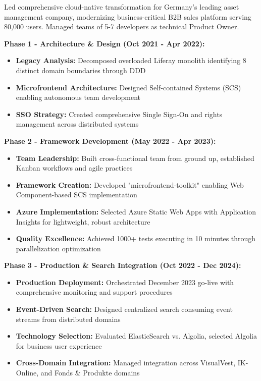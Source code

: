 \documentclass[10pt,a4paper]{article}
\begin{document}
Led comprehensive cloud-native transformation for Germany's leading asset management company, modernizing business-critical B2B sales platform serving 80,000 users. Managed teams of 5-7 developers as technical Product Owner.

\textbf{Phase 1 - Architecture \& Design (Oct 2021 - Apr 2022):}
\begin{itemize}
    \item \textbf{Legacy Analysis:} Decomposed overloaded Liferay monolith identifying 8 distinct domain boundaries through DDD
    \item \textbf{Microfrontend Architecture:} Designed Self-contained Systems (SCS) enabling autonomous team development
    \item \textbf{SSO Strategy:} Created comprehensive Single Sign-On and rights management across distributed systems
\end{itemize}

\textbf{Phase 2 - Framework Development (May 2022 - Apr 2023):}
\begin{itemize}
    \item \textbf{Team Leadership:} Built cross-functional team from ground up, established Kanban workflows and agile practices
    \item \textbf{Framework Creation:} Developed "microfrontend-toolkit" enabling Web Component-based SCS implementation
    \item \textbf{Azure Implementation:} Selected Azure Static Web Apps with Application Insights for lightweight, robust architecture
    \item \textbf{Quality Excellence:} Achieved 1000+ tests executing in 10 minutes through parallelization optimization
\end{itemize}

\textbf{Phase 3 - Production \& Search Integration (Oct 2022 - Dec 2024):}
\begin{itemize}
    \item \textbf{Production Deployment:} Orchestrated December 2023 go-live with comprehensive monitoring and support procedures
    \item \textbf{Event-Driven Search:} Designed centralized search consuming event streams from distributed domains
    \item \textbf{Technology Selection:} Evaluated ElasticSearch vs. Algolia, selected Algolia for business user experience
    \item \textbf{Cross-Domain Integration:} Managed integration across VisualVest, IK-Online, and Fonds \& Produkte domains
\end{itemize}
\end{document}
